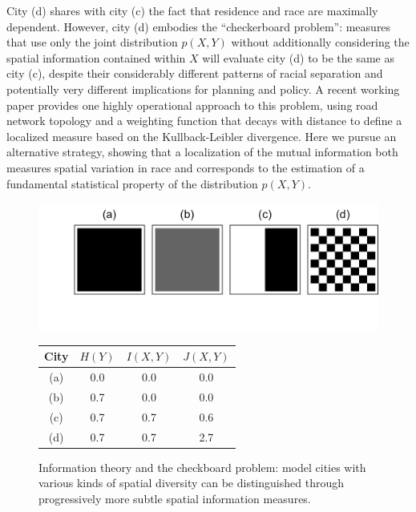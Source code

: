 	City (d) shares with city (c) the fact that residence and race are maximally dependent. However, city (d) embodies the ``checkerboard problem'': measures that use only the joint distribution $p(X,Y)$ without additionally considering the spatial information contained within $X$ will evaluate city (d) to be the same as city (c), despite their considerably different patterns of racial separation and potentially very different implications for planning and policy. A recent working paper \cite{Roberto2015} provides one highly operational approach to this problem, using road network topology and a weighting function that decays with distance to define a localized measure based on the Kullback-Leibler divergence. Here we pursue an alternative strategy, showing that a localization of the mutual information both measures spatial variation in race and corresponds to the estimation of a fundamental statistical property of the distribution $p(X,Y)$. 


	\begin{figure}
		\centering
		  \includegraphics[width=.7\linewidth]{figs/checkerboard.png}
		  \begin{tabular}{c | c c c}
			  City & $H(Y)$ & $I(X,Y)$ & $J(X,Y)$ \\
			  \hline			
			  (a) & 0.0 & 0.0 & 0.0\\
			  (b) & 0.7 & 0.0 & 0.0\\
			  (c) & 0.7 & 0.7 & 0.6\\
			  (d) & 0.7 & 0.7 & 2.7\\
			  \hline  
			\end{tabular}
		\caption{Information theory and the checkboard problem: model cities with various kinds of spatial diversity can be distinguished through progressively more subtle spatial information measures.}
		\label{fig:toy}
		\end{figure}

